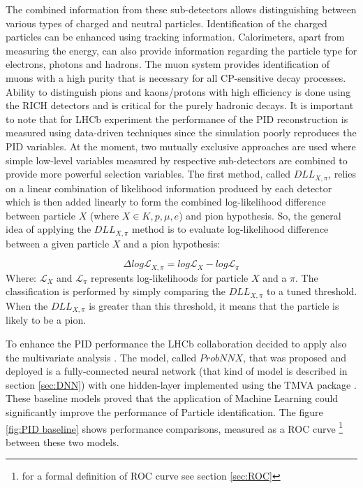 The combined information from these sub-detectors allows distinguishing between various types of charged and neutral particles. Identification of the charged particles can be enhanced using tracking information. Calorimeters, apart from measuring the energy, can also provide information regarding the particle type for electrons, photons and hadrons. The muon system provides identification of muons with a high purity that is necessary for all CP-sensitive decay processes. Ability to distinguish pions and kaons/protons with high efficiency is done using the RICH detectors and is critical for the purely hadronic decays. It is important to note that for LHCb experiment the performance of the PID reconstruction is measured using data-driven techniques since the simulation poorly reproduces the PID variables. At the moment, two mutually exclusive approaches are used where simple low-level variables measured by respective sub-detectors are combined to provide more powerful selection variables. The first method, called $DLL_{X,\pi}$, relies on a linear combination of likelihood information produced by each detector which is then added linearly to form the combined log-likelihood difference between particle $X$ (where $X \in {K, p, \mu, e}$) and pion hypothesis. So, the general idea of applying the $DLL_{X,\pi}$ method is to evaluate log-likelihood difference between a given particle $X$ and a pion hypothesis:

\begin{equation}
\Delta log \mathcal{L}_{X,\pi} = log \mathcal{L}_{X} - log \mathcal{L}_{\pi}  
\end{equation}
Where: $ \mathcal{L}_{X}$ and $ \mathcal{L}_{\pi}$ represents log-likelihoods for particle $X$ and a $\pi$. The classification is performed by simply comparing the $DLL_{X,\pi}$ to a tuned threshold. When the $DLL_{X,\pi}$ is greater than this threshold, it means that the particle is likely to be a pion. 


To enhance the PID performance the LHCb collaboration decided to apply also the multivariate analysis \cite{PID}. The model, called $ProbNNX$, that was proposed and deployed is a fully-connected neural network (that kind of model is described in section \ref{sec:DNN}) with one hidden-layer implemented using the TMVA package \cite{TMVA}. These baseline models proved that the application of Machine Learning could significantly improve the performance of Particle identification. The figure \ref{fig:PID baseline} shows performance comparisons, measured as a ROC curve \footnote{for a formal definition of ROC curve see section \ref{sec:ROC}} between these two models.

